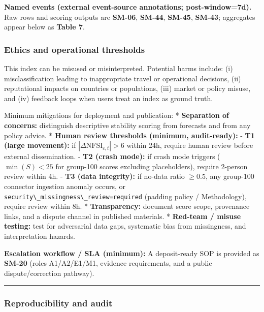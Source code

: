 \documentclass[
  11pt,
  peerreview,journal,onecolumn]{IEEEtran}
\newcommand{\passthrough}[1]{#1}
\begin{document}
\textbf{Named events (external event-source annotations;
post-window=7d).} Raw rows and scoring outputs are \textbf{SM-06},
\textbf{SM-44}, \textbf{SM-45}, \textbf{SM-43}; aggregates appear below
as \textbf{Table 7}.

\hypertarget{ethics-and-operational-thresholds}{%
\subsubsection{Ethics and operational
thresholds}\label{ethics-and-operational-thresholds}}

This index can be misused or misinterpreted. Potential harms include:
(i) misclassification leading to inappropriate travel or operational
decisions, (ii) reputational impacts on countries or populations, (iii)
market or policy misuse, and (iv) feedback loops when users treat an
index as ground truth.

Minimum mitigations for deployment and publication: * \textbf{Separation
of concerns:} distinguish descriptive stability scoring from forecasts
and from any policy advice. * \textbf{Human review thresholds (minimum,
audit-ready):} - \textbf{T1 (large movement):} if
\(|\Delta \text{NFSI}_{c,t}| > 6\) within 24h, require human review
before external dissemination. - \textbf{T2 (crash mode):} if crash mode
triggers (\(\min(S)<25\) for group-100 scores excluding placeholders),
require 2-person review within 4h. - \textbf{T3 (data integrity):} if
no-data ratio \(\ge 0.5\), any group-100 connector ingestion anomaly
occurs, or
\passthrough{\lstinline!security\_missingness\_review=required!}
(padding policy / Methodology), require review within 8h. *
\textbf{Transparency:} document score scope, provenance links, and a
dispute channel in published materials. * \textbf{Red-team / misuse
testing:} test for adversarial data gaps, systematic bias from
missingness, and interpretation hazards.

\textbf{Escalation workflow / SLA (minimum):} A deposit-ready SOP is
provided as \textbf{SM-20} (roles A1/A2/E1/M1, evidence requirements,
and a public dispute/correction pathway).

\begin{center}\rule{0.5\linewidth}{0.5pt}\end{center}

\hypertarget{reproducibility-and-audit}{%
\subsubsection{Reproducibility and
audit}\label{reproducibility-and-audit}}
\end{document}
